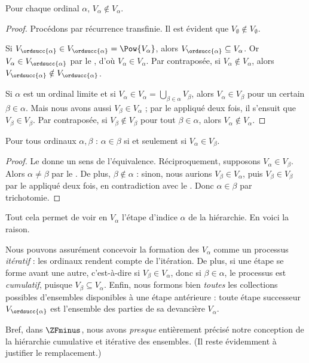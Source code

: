 \documentclass[../../../include/open-logic-section]{subfiles}
\begin{document}
\begin{lem}
Pour chaque ordinal $\alpha$, $V_\alpha \notin V_\alpha$.
\end{lem}

\begin{proof}
Procédons par récurrence transfinie. Il est évident que
$V_\emptyset \notin V_\emptyset$.

Si $V_{\ordsucc{\alpha}} \in V_{\ordsucc{\alpha}} =
\Pow{V_\alpha}$, alors
$V_{\ordsucc{\alpha}} \subseteq V_\alpha$. Or
$V_\alpha \in V_{\ordsucc{\alpha}}$ par le
, d'où $V_\alpha \in V_\alpha$.
Par contraposée, si $V_\alpha \notin V_\alpha$, alors
$V_{\ordsucc{\alpha}} \notin V_{\ordsucc{\alpha}}$.

Si $\alpha$ est un ordinal limite et si
$V_\alpha \in V_\alpha = \bigcup_{\beta \in \alpha}V_\beta$,
alors $V_\alpha \in V_\beta$ pour un certain $\beta \in \alpha$.
Mais nous avons aussi $V_\beta \in V_\alpha$ ; par le
 appliqué deux fois, il s'ensuit que
$V_\beta \in V_\beta$. Par contraposée, si
$V_\beta \notin V_\beta$ pour tout $\beta \in \alpha$, alors
$V_\alpha \notin V_\alpha$.
\end{proof}

\begin{cor}
Pour tous ordinaux $\alpha, \beta$ :
$\alpha \in \beta$ si et seulement si $V_\alpha \in V_\beta$.
\end{cor}

\begin{proof}
Le  donne un sens de l'équivalence.
Réciproquement, supposons $V_\alpha \in V_\beta$. Alors
$\alpha \neq \beta$ par le . De plus,
$\beta \notin \alpha$ : sinon, nous aurions
$V_\beta \in V_\alpha$, puis $V_\beta \in V_\beta$ par le
 appliqué deux fois, en contradiction avec
le . Donc $\alpha \in \beta$ par trichotomie.
\end{proof}
\noindent
Tout cela permet de voir en $V_\alpha$ l'étape d'indice $\alpha$ de
la hiérarchie. En voici la raison.

Nous pouvons assurément concevoir la formation des $V_\alpha$
comme un processus \emph{itératif} : les ordinaux rendent compte de
l'itération. De plus, si une étape se forme avant une autre,
c'est-à-dire si $V_\beta \in V_\alpha$, donc si
$\beta \in \alpha$, le processus est \emph{cumulatif}, puisque
$V_\beta \subseteq V_\alpha$. Enfin, nous formons bien \emph{toutes}
les collections possibles d'ensembles disponibles à une étape
antérieure : toute étape successeur $V_{\ordsucc{\alpha}}$ est
l'ensemble des parties de sa devancière $V_\alpha$.

Bref, dans $\ZFminus$, nous avons \emph{presque} entièrement précisé
notre conception de la hiérarchie cumulative et itérative des
ensembles. (Il reste évidemment à justifier le remplacement.)
\end{document}
